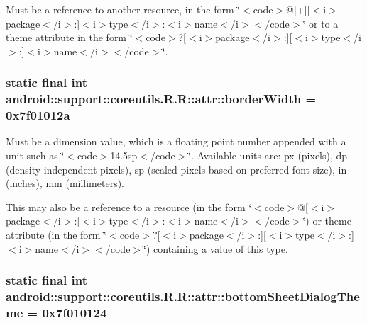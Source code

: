 Must be a reference to another resource, in the form \char`\"{}$<$code$>$@\mbox{[}+\mbox{]}\mbox{[}$<$i$>$package$<$/i$>$:\mbox{]}$<$i$>$type$<$/i$>$:$<$i$>$name$<$/i$>$$<$/code$>$\char`\"{} or to a theme attribute in the form \char`\"{}$<$code$>$?\mbox{[}$<$i$>$package$<$/i$>$:\mbox{]}\mbox{[}$<$i$>$type$<$/i$>$:\mbox{]}$<$i$>$name$<$/i$>$$<$/code$>$\char`\"{}. \hypertarget{classandroid_1_1support_1_1coreutils_1_1_r_1_1attr_687489cdf0b89298f28dd7ee480d8b29}{
\subsubsection[{borderWidth}]{\setlength{\rightskip}{0pt plus 5cm}static final int android::support::coreutils.R.R::attr::borderWidth = 0x7f01012a}}
\label{classandroid_1_1support_1_1coreutils_1_1_r_1_1attr_687489cdf0b89298f28dd7ee480d8b29}


Must be a dimension value, which is a floating point number appended with a unit such as \char`\"{}$<$code$>$14.5sp$<$/code$>$\char`\"{}. Available units are: px (pixels), dp (density-independent pixels), sp (scaled pixels based on preferred font size), in (inches), mm (millimeters). 

This may also be a reference to a resource (in the form \char`\"{}$<$code$>$@\mbox{[}$<$i$>$package$<$/i$>$:\mbox{]}$<$i$>$type$<$/i$>$:$<$i$>$name$<$/i$>$$<$/code$>$\char`\"{}) or theme attribute (in the form \char`\"{}$<$code$>$?\mbox{[}$<$i$>$package$<$/i$>$:\mbox{]}\mbox{[}$<$i$>$type$<$/i$>$:\mbox{]}$<$i$>$name$<$/i$>$$<$/code$>$\char`\"{}) containing a value of this type. \hypertarget{classandroid_1_1support_1_1coreutils_1_1_r_1_1attr_6e80a19b40960d24b207387a46127e10}{
\subsubsection[{bottomSheetDialogTheme}]{\setlength{\rightskip}{0pt plus 5cm}static final int android::support::coreutils.R.R::attr::bottomSheetDialogTheme = 0x7f010124}}
\label{classandroid_1_1support_1_1coreutils_1_1_r_1_1attr_6e80a19b40960d24b207387a46127e10}


